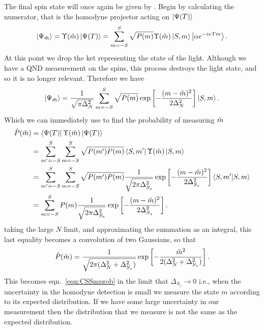 The final spin state will once again be given by
. Begin by calculating the numerator, that is
the homodyne projector acting on $\ket{\Psi(T)}$
%
\begin{equation}
  \ket{\Psi_{\tilde{m}}} = \Upsilon(\tilde{m})\ket{\Psi(T)} =
  \sum_{m=-S}^{S}\sqrt{P(m)}\Upsilon(\tilde{m})\ket{S,m}\ket{\alpha e^{-i\nu Tm}}.
\end{equation}
%
At this point we drop the ket representing the state of the light. Although we
have a QND measurement on the spins, this process destroys the light state, and
so it is no longer relevant. Therefore we have
%
\begin{equation}
  \ket{\Psi_{\tilde{m}}} = 
  \frac{1}{\sqrt{\pi\Delta_N^2}}\sum_{m=-S}^S \sqrt{P(m)} \exp\left[
    -\frac{(m-\tilde{m})^2}{2\Delta_N^2}\right]\ket{S,m}.
\end{equation}
%
Which we can immediately use to find the probability of measuring $\tilde{m}$
%
\begin{align}
  \tilde{P}(\tilde{m}) &= \bra{\Psi(T)}\Upsilon(\tilde{m})\ket{\Psi(T)}\\
  & = \sum_{m'=-S}^S \sum_{m=-S}^S \sqrt{P(m')P(m)}\bra{S,
  m'}\Upsilon(\tilde{m})\ket{S, m} \\
  & = \sum_{m'=-S}^S \sum_{m=-S}^S \sqrt{P(m')P(m)}
  \frac{1}{\sqrt{2\pi\Delta_{S_z}^2}}\exp\left[-\frac{(m-\tilde{m})^2}{2\Delta_{S_z}^2}\right] 
  \bra{S, m'}\ket{S, m} \\
  &= \sum_{m=-S}^{S} P(m) 
  \frac{1}{\sqrt{2\pi\Delta_{S_z}^2}}\exp\left[-\frac{(m-\tilde{m})^2}{2\Delta_{S_z}^2}\right] .
\end{align}
%
taking the large $N$ limit, and approximating the summation as an integral,
this last equality becomes a convolution of two Gaussians, so that
%
\begin{equation}
  \tilde{P}(\tilde{m}) = \frac{1}{\sqrt{2\pi(\Delta_N^2 + \Delta_{S_z}^2)}}\exp\left[
    -\frac{\tilde{m}^2}{2(\Delta_N^2 + \Delta_{S_z}^2)}\right].
\end{equation}
%
This becomes eqn.~\ref{eqn:CSSmprob} in the limit that $\Delta_{S_z} \to 0$
i.e., when the uncertainty in the homodyne detection is small we measure the
state $m$ according to its expected distribution. If we have some large
uncertainty in our measurement then the distribution that we measure is not the
same as the expected distribution.

